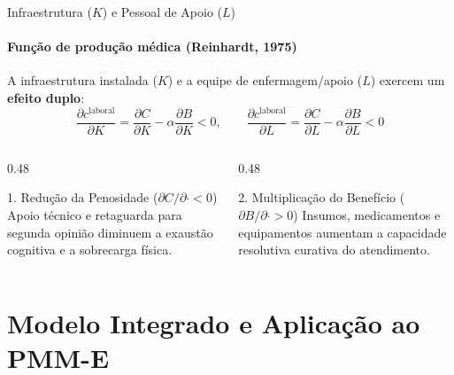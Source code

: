 \documentclass[aspectratio=169, 10pt]{beamer}
\begin{document}
\begin{frame}{Infraestrutura ($K$) e Pessoal de Apoio ($L$)}
  \framesubtitle{Função de produção médica (Reinhardt, 1975)}

  A infraestrutura instalada ($K$) e a equipe de enfermagem/apoio ($L$) exercem um \textbf{efeito duplo}:
  \begin{equation}
    \frac{\partial c^{\text{laboral}}}{\partial K} = \frac{\partial C}{\partial K} - \alpha \frac{\partial B}{\partial K} < 0,
    \qquad
    \frac{\partial c^{\text{laboral}}}{\partial L} = \frac{\partial C}{\partial L} - \alpha \frac{\partial B}{\partial L} < 0
  \end{equation}

  \begin{columns}[T]
    \begin{column}{0.48\textwidth}
      \begin{block}{1. Redução da Penosidade ($\partial C / \partial \cdot < 0$)}
        Apoio técnico e retaguarda para segunda opinião diminuem a exaustão cognitiva e a sobrecarga física.
      \end{block}
    \end{column}

    \begin{column}{0.48\textwidth}
      \begin{block}{2. Multiplicação do Benefício ($\partial B / \partial \cdot > 0$)}
        Insumos, medicamentos e equipamentos aumentam a capacidade resolutiva curativa do atendimento.
      \end{block}
    \end{column}
  \end{columns}
\end{frame}

\section{Modelo Integrado e Aplicação ao PMM-E}
\end{document}
